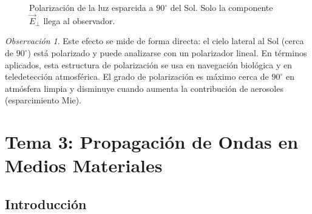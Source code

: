 \documentclass[12pt, a4paper]{article}
\theoremstyle{plain}
\theoremstyle{definition}
\theoremstyle{remark}
\newtheorem*{observacion}{Observación}
\newcommand{\ve}[1]{\vec{#1}}
\begin{document}
\begin{figure}[H]
  \centering
  \caption{Polarización de la luz esparcida a $90^{\circ}$ del Sol.
           Solo la componente $\ve{E}_\perp$ llega al observador.}
  \label{fig:pol_esparcida}
\end{figure}

\begin{observacion}
Este efecto se mide de forma directa: el cielo lateral al Sol
(cerca de $90^{\circ}$) está polarizado y puede analizarse con un polarizador
lineal. En términos aplicados, esta estructura de polarización se usa en
navegación biológica y en teledetección atmosférica.
El grado de polarización es máximo cerca de $90^\circ$ en atmósfera limpia y
disminuye cuando aumenta la contribución de aerosoles (esparcimiento Mie).
\end{observacion}

\section{Tema 3: Propagación de Ondas en Medios Materiales}

\subsection{Introducción}
\end{document}
